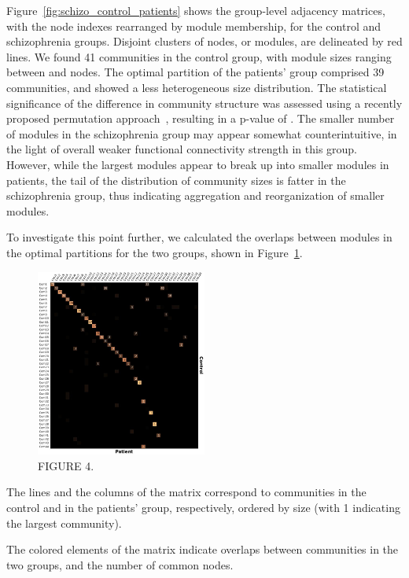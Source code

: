 Figure~\ref{fig:schizo_control_patients} shows the group-level adjacency matrices, with the node indexes rearranged by module membership, for the control and schizophrenia groups.
Disjoint clusters of nodes, or modules, are delineated by red lines.
We found 41 communities in the control group, with module sizes ranging between  and  nodes.
The optimal partition of the patients' group comprised 39 communities, and showed a less heterogeneous size distribution.
The statistical significance of the difference in community structure was assessed using a recently proposed permutation approach~\cite{alexander-bloch2012}, resulting in a p-value of .
The smaller number of modules in the schizophrenia group may appear somewhat counterintuitive, in the light of overall weaker functional connectivity strength in this group.
However, while the largest modules appear to break up into smaller modules in patients, the tail of the distribution of community sizes is fatter in the schizophrenia group, thus indicating aggregation and reorganization of smaller modules.

To investigate this point further, we calculated the overlaps between modules in the optimal partitions for the two groups, shown in Figure~\ref{fig:schizo_figure4}.

\begin{figure}
\centering
\includegraphics[width=0.5\textwidth]{images/schizo/schizo_fig_4.jpg}
\caption{FIGURE 4.}
\label{fig:schizo_figure4}
\end{figure}

The lines and the columns of the matrix correspond to communities in the control and in the patients' group, respectively, ordered by size (with 1 indicating the largest community).

The colored elements of the matrix indicate overlaps between communities in the two groups, and the number of common nodes.


